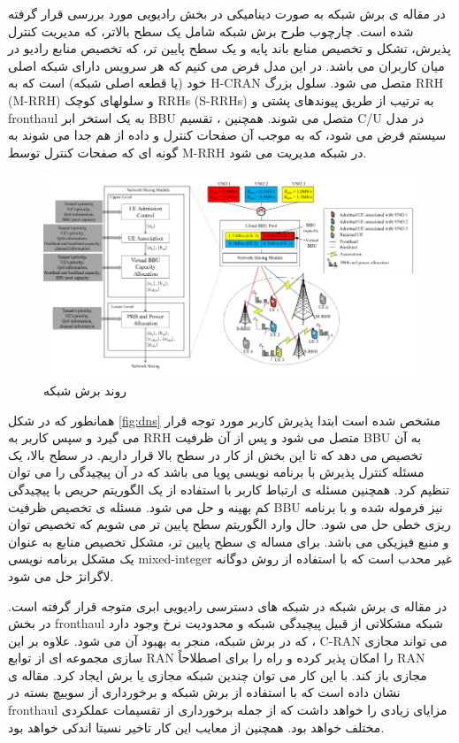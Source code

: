 در مقاله ی \cite{lee2018dynamic}
برش شبکه به صورت دینامیکی در بخش رادیویی مورد بررسی قرار گرفته شده است.
چارچوب طرح برش شبکه شامل یک سطح بالاتر، که مدیریت کنترل پذیرش، تشکل و تخصیص منابع باند پایه و یک سطح پایین تر، که تخصیص منابع رادیو در میان کاربران می باشد.
در این مدل فرض می کنیم که هر سرویس دارای شبکه اصلی خود (یا قطعه اصلی شبکه) است که به H-CRAN متصل می شود.
سلول بزرگ RRH (M-RRH) و سلولهای کوچک RRHs (S-RRHs) به ترتیب از طریق پیوندهای پشتی و fronthaul به یک استخر ابر
BBU  متصل می شوند.
همچنین ، تقسیم C/U در مدل سیستم فرض می شود، که به موجب آن صفحات کنترل و داده از هم جدا می شوند به گونه ای که صفحات کنترل توسط M-RRH در شبکه مدیریت می شود.
\begin{figure}[H]
  \centering
    \includegraphics[scale = 0.7]{./fig/dynamicNS}
  \caption{روند برش شبکه\ \cite{lee2018dynamic}}
  \label{fig:dns}
\end{figure}
همانطور که در شکل \eqref{fig:dns} 
مشخص شده است ابتدا پذیرش کاربر مورد توجه قرار می گیرد و سپس کاربر به RRH متصل می شود و پس از آن ظرفیت BBU به آن تخصیص می دهد که تا این بخش از کار در سطح بالا قرار داریم.
در سطح بالا، یک مسئله کنترل پذیرش با برنامه نویسی پویا می باشد که در آن پیچیدگی را می توان تنظیم کرد.
همچنین مسئله ی ارتباط کاربر با استفاده از یک الگوریتم حریص با پیچیدگی کم بهینه و حل می شود.
 مسئله ی تخصیص ظرفیت BBU نیز فرموله شده و با برنامه ریزی خطی حل می شود.
 حال وارد الگوریتم سطح پایین تر می شویم که تخصیص توان و منبع فیزیکی می باشد.
برای مساله ی سطح پایین تر، مشکل تخصیص منابع به عنوان یک مشکل برنامه نویسی mixed-integer غیر محدب است که با استفاده از روش دوگانه لاگرانژ حل می شود.

در مقاله ی 
\cite{larsen2018fronthaul,costanzo2018network}
برش شبکه در شبکه های دسترسی رادیویی ابری متوجه قرار گرفته است. 
در بخش fronthaul شبکه مشکلاتی از قبیل پیچیدگی شبکه و محدودیت نرخ وجود دارد که در برش شبکه، منجر به بهبود آن می شود.
علاوه بر این ، C-RAN می تواند مجازی سازی مجموعه ای از توابع RAN را امکان پذیر کرده و راه را برای اصطلاحاً RAN مجازی باز کند. با این کار می توان چندین شبکه مجازی یا برش ایجاد کرد.
 مقاله ی
\cite{larsen2018fronthaul}
نشان داده است که با استفاده از برش شبکه و برخورداری از سوییچ بسته در fronthaul
مزایای زیادی را خواهد داشت که از جمله برخورداری از تقسیمات عملکردی مختلف خواهد بود. همچنین از معایب این کار تاخیر نسبتا اندکی خواهد بود.

